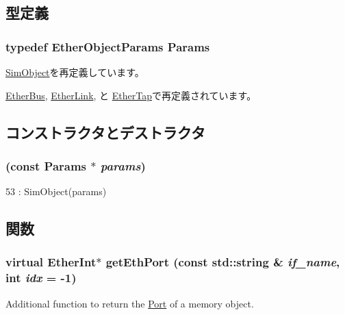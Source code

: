 \subsection{型定義}
\hypertarget{classEtherObject_a47be5a25ff75cbf22f60f87dde950e13}{
\subsubsection[{Params}]{\setlength{\rightskip}{0pt plus 5cm}typedef EtherObjectParams {\bf Params}}}
\label{classEtherObject_a47be5a25ff75cbf22f60f87dde950e13}


\hyperlink{classSimObject_a0f0761d2db586a23bb2a2880b8f387bb}{SimObject}を再定義しています。

\hyperlink{classEtherBus_af0984f6bd7717c1679765dfdacae4ddd}{EtherBus}, \hyperlink{classEtherLink_ae2a807ee6467a63dfb496f847857b7df}{EtherLink}, と \hyperlink{classEtherTap_a0d1f916d5d6c5769fc7f043e0f4a6372}{EtherTap}で再定義されています。

\subsection{コンストラクタとデストラクタ}
\hypertarget{classEtherObject_a8de016313351ab48276a97c330db110c}{
\subsubsection[{EtherObject}]{ (const {\bf Params} $\ast$ {\em params})}}
\label{classEtherObject_a8de016313351ab48276a97c330db110c}



\begin{DoxyCode}
53         : SimObject(params) {}
\end{DoxyCode}


\subsection{関数}
\hypertarget{classEtherObject_ac1aa24c1f8c0f1ee8bdc3f3d3799f67c}{
\subsubsection[{getEthPort}]{\setlength{\rightskip}{0pt plus 5cm}virtual {\bf EtherInt}$\ast$ getEthPort (const std::string \& {\em if\_\-name}, \/  int {\em idx} = {\ttfamily -\/1})}}
\label{classEtherObject_ac1aa24c1f8c0f1ee8bdc3f3d3799f67c}
Additional function to return the \hyperlink{classPort}{Port} of a memory object. 

